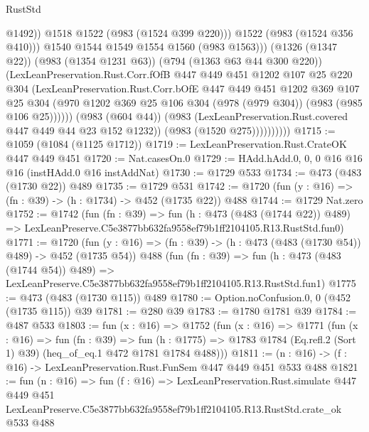 \begin{lexlean}{RustStd}
\begin{coremodule}
                                  @1492))
                              @1518
                              @1522
                              (@983 (@1524 @399 @220)))
                            @1522
                            (@983 (@1524 @356 @410)))
                          @1540
                          @1544
                          @1549
                          @1554
                          @1560
                          (@983 @1563)))
                      (@1326 (@1347 @22))
                      (@983 (@1354 @1231 @63))
                      (@794 (@1363 @63 @44 @300 @220))
                      (LexLeanPreservation.Rust.Corr.fOfB
                        @447
                        @449
                        @451
                        @1202
                        @107
                        @25
                        @220
                        @304
                        (LexLeanPreservation.Rust.Corr.bOfE
                          @447
                          @449
                          @451
                          @1202
                          @369
                          @107
                          @25
                          @304
                          (@970
                            @1202
                            @369
                            @25
                            @106
                            @304
                            (@978 (@979 @304))
                            (@983 (@985 @106 @25))))))
                    (@983 (@604 @44))
                    (@983 (LexLeanPreservation.Rust.covered @447 @449 @44 @23 @152 @1232))
                    (@983 (@1520 @275))))))))))
@1715 := @1059 (@1084 (@1125 @1712))
@1719 := LexLeanPreservation.Rust.CrateOK @447 @449 @451
@1720 := Nat.casesOn.{0}
@1729 := HAdd.hAdd.{0, 0, 0} @16 @16 @16 (instHAdd.{0} @16 instAddNat)
@1730 := @1729 @533
@1734 := @473 (@483 (@1730 @22)) @489
@1735 := @1729 @531
@1742 := @1720 (fun (y : @16) => (fn : @39) -> (h : @1734) -> @452 (@1735 @22)) @488
@1744 := @1729 Nat.zero
@1752 := @1742
    (fun (fn : @39) =>
    fun (h : @473 (@483 (@1744 @22)) @489) =>
    LexLeanPreserve.C5e3877bb632fa9558ef79b1ff2104105.R13.RustStd.fun0)
@1771 := @1720
    (fun (y : @16) => (fn : @39) -> (h : @473 (@483 (@1730 @54)) @489) -> @452 (@1735 @54))
    @488
    (fun (fn : @39) =>
    fun (h : @473 (@483 (@1744 @54)) @489) =>
    LexLeanPreserve.C5e3877bb632fa9558ef79b1ff2104105.R13.RustStd.fun1)
@1775 := @473 (@483 (@1730 @115)) @489
@1780 := Option.noConfusion.{0, 0} (@452 (@1735 @115)) @39
@1781 := @280 @39
@1783 := @1780 @1781 @39
@1784 := @487 @533
@1803 := fun (x : @16) =>
  @1752
    (fun (x : @16) =>
    @1771
      (fun (x : @16) =>
      fun (fn : @39) =>
      fun (h : @1775) =>
      @1783 @1784 (Eq.refl.{2} (Sort 1) @39) (heq_of_eq.{1} @472 @1781 @1784 @488)))
@1811 := (n : @16) -> (f : @16) -> LexLeanPreservation.Rust.FunSem @447 @449 @451 @533 @488
@1821 := fun (n : @16) =>
  fun (f : @16) =>
  LexLeanPreservation.Rust.simulate
    @447
    @449
    @451
    LexLeanPreserve.C5e3877bb632fa9558ef79b1ff2104105.R13.RustStd.crate_ok
    @533
    @488
\end{coremodule}
\end{lexlean}

